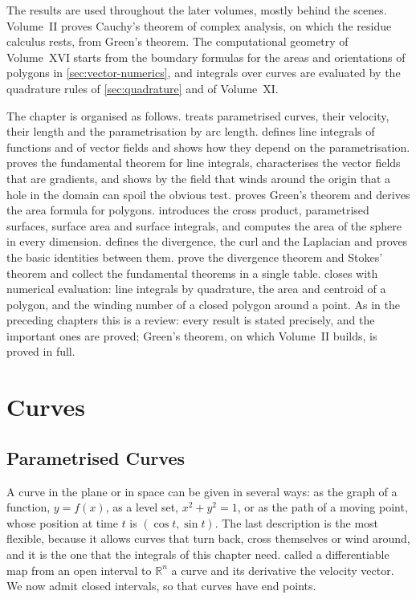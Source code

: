 The results are used throughout the later volumes, mostly behind the scenes. Volume~II proves Cauchy's theorem of complex analysis, on which the residue calculus rests, from Green's theorem. The computational geometry of Volume~XVI starts from the boundary formulas for the areas and orientations of polygons in \cref{sec:vector-numerics}, and integrals over curves are evaluated by the quadrature rules of \cref{sec:quadrature} and of Volume~XI.

The chapter is organised as follows.  treats parametrised curves, their velocity, their length and the parametrisation by arc length.  defines line integrals of functions and of vector fields and shows how they depend on the parametrisation.  proves the fundamental theorem for line integrals, characterises the vector fields that are gradients, and shows by the field that winds around the origin that a hole in the domain can spoil the obvious test.  proves Green's theorem and derives the area formula for polygons.  introduces the cross product, parametrised surfaces, surface area and surface integrals, and computes the area of the sphere in every dimension.  defines the divergence, the curl and the Laplacian and proves the basic identities between them.  prove the divergence theorem and Stokes' theorem and collect the fundamental theorems in a single table.  closes with numerical evaluation: line integrals by quadrature, the area and centroid of a polygon, and the winding number of a closed polygon around a point. As in the preceding chapters this is a review: every result is stated precisely, and the important ones are proved; Green's theorem, on which Volume~II builds, is proved in full.

\section{Curves}
\label{sec:curves}

\subsection{Parametrised Curves}

A curve in the plane or in space can be given in several ways: as the graph of a function, $y=f(x)$, as a level set, $x^2+y^2=1$, or as the path of a moving point, whose position at time $t$ is $(\cos t,\sin t)$. The last description is the most flexible, because it allows curves that turn back, cross themselves or wind around, and it is the one that the integrals of this chapter need.  called a differentiable map from an open interval to $\mathbb R^n$ a curve and its derivative the velocity vector. We now admit closed intervals, so that curves have end points.

